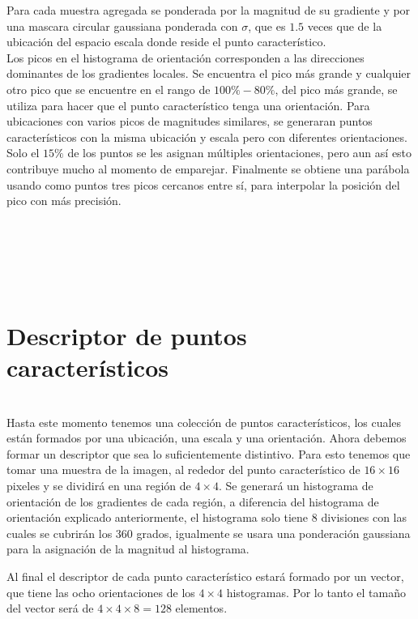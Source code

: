 		Para cada muestra agregada se ponderada por la magnitud de su gradiente y por una mascara circular gaussiana ponderada con $\sigma$, que es $1.5$ veces que de la ubicación del espacio escala donde reside el punto característico.\\
		\pagebreak
		Los picos en el histograma de orientación corresponden a las direcciones dominantes de los gradientes locales. Se encuentra el pico más grande y cualquier otro pico que se encuentre en el rango de $100\% - 80\%$, del pico más grande, se utiliza para hacer que el punto característico tenga una orientación. Para ubicaciones con varios picos de magnitudes similares, se generaran puntos característicos con la misma ubicación y escala pero con diferentes orientaciones. Solo el $15\%$ de los puntos se les asignan múltiples orientaciones, pero aun así esto contribuye mucho al momento de emparejar. Finalmente se obtiene una parábola usando como puntos tres picos cercanos entre sí, para interpolar la posición del pico con más precisión.  \\\\\\\\\\\ \pagebreak
	
	
	

		

\section{Descriptor de puntos característicos} \hfill \\

		
	Hasta este momento tenemos una colección de puntos característicos, los cuales están formados por una ubicación, una escala y una orientación. Ahora debemos formar un descriptor que sea lo suficientemente distintivo. Para esto tenemos que tomar una muestra de la imagen, al rededor del punto característico de $16\times16$ pixeles y se dividirá en una región de $4 \times 4$. Se generará un histograma de orientación de los gradientes de cada región, a diferencia del histograma de orientación explicado anteriormente, el histograma solo tiene 8 divisiones con las cuales se cubrirán los 360 grados, igualmente se usara una ponderación gaussiana para la asignación de la magnitud al histograma.
		
	Al final el descriptor de cada punto característico estará formado por un vector, que tiene las ocho orientaciones de los $4\times4$ histogramas. Por lo tanto el tamaño del vector será de $4\times4\times8 = 128$ elementos. 
 	
